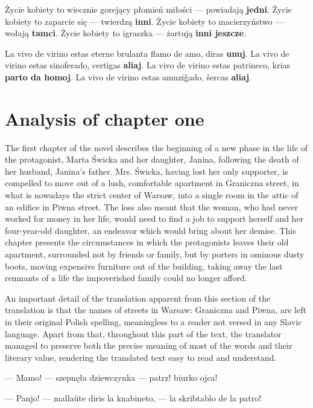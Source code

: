 
Życie kobiety to wiecznie gorejący płomień miłości --- powiadają \textbf{jedni}.
Życie kobiety to zaparcie się --- twierdzą \textbf{inni}.
Życie kobiety to macierzyństwo --- wołają \textbf{tamci}.
Życie kobiety to igraszka --- żartują \textbf{inni jeszcze}.

La vivo de virino estas eterne brulanta flamo de amo, diras \textbf{unuj}. La vivo de virino estas sinoferado, certigas \textbf{aliaj}. La vivo de virino estas patrineco, krias \textbf{parto da homoj}. La vivo de virino estas amuziĝado, ŝercas \textbf{aliaj}.

\section{Analysis of chapter one}

The first chapter of the novel describes the beginning of a new phase in the life of the protagonist, Marta Świcka and her daughter, Janina, following the death of her husband, Janina's father.
Mrs. Świcka, having lost her only supporter, is compelled to move out of a lush, comfortable apartment in Graniczna street, in what is nowadays the strict center of Warsaw, into a single room in the attic of an edifice in Piwna street.
The loss also meant that the woman, who had never worked for money in her life, would need to find a job to support herself and her four-year-old daughter, an endeavor which would bring about her demise.
This chapter presents the circumstances in which the protagonists leaves their old apartment, surrounded not by friends or family, but by porters in ominous dusty boots, moving expensive furniture out of the building, taking away the last remnants of a life the impoverished family could no longer afford.

An important detail of the translation apparent from this section of the translation is that the names of streets in Warsaw: Graniczna and Piwna, are left in their original Polish spelling, meaningless to a reader not versed in any Slavic language. %
Apart from that, throughout this part of the text, the translator managed to preserve both the precise meaning of most of the words and their literary value, rendering the translated text easy to read and understand.

--- Mamo! --- szepnęła dziewczynka --- patrz! biurko ojca!

--- Panjo! --- mallaŭte diris la knabineto, --- la skribtablo de la patro!

